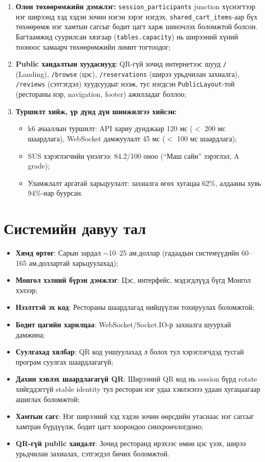 \begin{enumerate}[leftmargin=*]
  \item \textbf{Олон төхөөрөмжийн дэмжлэг:} \texttt{session\_participants}
    junction хүснэгтээр нэг ширээнд хэд хэдэн зочин нэгэн зэрэг нэгдэх,
    \texttt{shared\_cart\_items}-аар бүх төхөөрөмж нэг хамтын сагсыг бодит
    цагт харж шинэчлэх боломжтой болсон. Багтаамжид суурилсан хязгаар
    (\texttt{tables.capacity}) нь ширээний хүний тооноос хамаарч төхөөрөмжийн
    лимит тогтоодог;

  \item \textbf{Public хандалтын хуудаснууд:} QR-гүй зочид интернетээс шууд
    \texttt{/} (Landing), \texttt{/browse} (цэс), \texttt{/reservations}
    (ширээ урьдчилан захиалга), \texttt{/reviews} (сэтгэгдэл) хуудсуудыг
    нээж, тус нэгдсэн \texttt{PublicLayout}-той (рестораны нэр, navigation,
    footer) ажилладаг боллоо;

  \item \textbf{Туршилт хийж, үр дүнд дүн шинжилгээ хийсэн:}
    \begin{itemize}
      \item k6 ачааллын туршилт: API хариу дунджаар 120 мс ($<$ 200 мс шаардлага),
        WebSocket дамжуулалт 45 мс ($<$ 100 мс шаардлага);
      \item SUS хэрэглэгчийн үнэлгээ: 84.2/100 оноо (``Маш сайн'' зэрэглэл, A grade);
      \item Уламжлалт аргатай харьцуулалт: захиалга өгөх хугацаа 62\%, алдааны хувь
        94\%-иар буурсан.
    \end{itemize}
\end{enumerate}

\section*{Системийн давуу тал}

\begin{itemize}
  \item \textbf{Хямд өртөг}: Сарын зардал $\sim$10--25 ам.доллар (гадаадын системүүдийн
    60--165 ам.доллартай харьцуулахад);
  \item \textbf{Монгол хэлний бүрэн дэмжлэг}: Цэс, интерфейс, мэдэгдлүүд
    бүгд Монгол хэлээр;
  \item \textbf{Нээлттэй эх код}: Рестораны шаардлагад нийцүүлэн тохируулах боломжтой;
  \item \textbf{Бодит цагийн харилцаа}: WebSocket/Socket.IO-р захиалга шуурхай дамжина;
  \item \textbf{Суулгахад хялбар}: QR код уншуулахад л болох тул хэрэглэгчдэд тусгай
    програм суулгах шаардлагагүй;
  \item \textbf{Дахин хэвлэх шаардлагагүй QR}: Ширээний QR код нь session бүрд
    rotate хийгддэггүй stable identity тул ресторан нэг удаа хэвлэснээ удаан
    хугацаагаар ашиглах боломжтой;
  \item \textbf{Хамтын сагс}: Нэг ширээний хэд хэдэн зочин өөрсдийн утаснаас
    нэг сагсыг хамтран бүрдүүлж, бодит цагт хоорондоо синхрончлогдоно;
  \item \textbf{QR-гүй public хандалт}: Зочид ресторанд ирэхээс өмнө цэс үзэх,
    ширээ урьдчилан захиалах, сэтгэгдэл бичих боломжтой.
\end{itemize}

